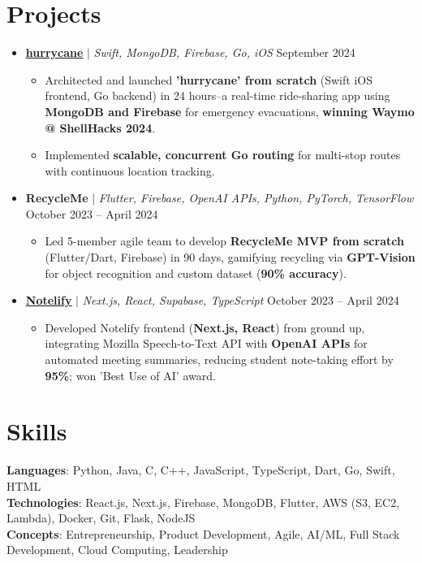 \documentclass[letterpaper,11pt]{article}
\newcommand{\resumeItem}[1]{
  \item\small{
    {#1 \vspace{-2pt}}
  }
}
\newcommand{\resumeProjectHeading}[2]{
  \item
  \small#1 \hfill #2 \\
  \vspace{-7pt} %
}
\newcommand{\resumeSubHeadingListStart}{\begin{itemize}[leftmargin=0.15in, label={}]}
\newcommand{\resumeSubHeadingListEnd}{\end{itemize}}
\newcommand{\resumeItemListStart}{\begin{itemize}}
\newcommand{\resumeItemListEnd}{\end{itemize}\vspace{-5pt}}
\begin{document}
\section{Projects}
    \resumeSubHeadingListStart
    \resumeProjectHeading
          {\underline{\textbf {\href{https://github.com/keshavbabu/shellhacks/tree/main}{hurrycane}}} $|$ \emph{Swift, MongoDB, Firebase, Go, iOS}}{September 2024}
          \resumeItemListStart
            \resumeItem{Architected and launched \textbf{'hurrycane' from scratch} (Swift iOS frontend, Go backend) in 24 hours--a real-time ride-sharing app using \textbf{MongoDB and Firebase} for emergency evacuations, \textbf{winning Waymo @ ShellHacks 2024}.}
            \resumeItem{Implemented \textbf{scalable, concurrent Go routing} for multi-stop routes with continuous location tracking.}
          \resumeItemListEnd
      \resumeProjectHeading
          {\textbf{RecycleMe} $|$ \emph{Flutter, Firebase, OpenAI APIs, Python, PyTorch, TensorFlow}}{October 2023 -- April 2024}
          \resumeItemListStart
            \resumeItem{Led 5-member agile team to develop \textbf{RecycleMe MVP from scratch} (Flutter/Dart, Firebase) in 90 days, gamifying recycling via \textbf{GPT-Vision} for object recognition and custom dataset (\textbf{90\% accuracy}).}
          \resumeItemListEnd
      \resumeProjectHeading
          {\underline{\textbf {\href{https://www.notelify.co/}{Notelify}}} $|$ \emph{Next.js, React, Supabase, TypeScript}}{October 2023 -- April 2024}
          \resumeItemListStart
            \resumeItem{Developed Notelify frontend (\textbf{Next.js, React}) from ground up, integrating Mozilla Speech-to-Text API with \textbf{OpenAI APIs} for automated meeting summaries, reducing student note-taking effort by \textbf{95\%}; won 'Best Use of AI' award.}
          \resumeItemListEnd
    \resumeSubHeadingListEnd

\section{Skills}
 \begin{itemize}[leftmargin=0.15in, label={}]
    \small{\item{
     \textbf{Languages}{: Python, Java, C, C++, JavaScript, TypeScript, Dart, Go, Swift, HTML} \\
     \textbf{Technologies}{: React.js, Next.js, Firebase, MongoDB, Flutter, AWS (S3, EC2, Lambda), Docker, Git, Flask, NodeJS} \\
     \textbf{Concepts}{: Entrepreneurship, Product Development, Agile, AI/ML, Full Stack Development, Cloud Computing, Leadership} }}
 \end{itemize}
 
%
\end{document}
